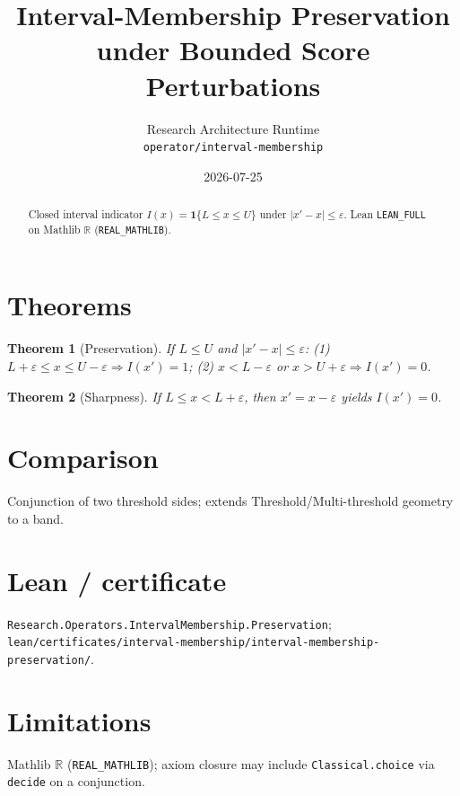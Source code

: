 \documentclass[11pt]{article}
\title{Interval-Membership Preservation under Bounded Score Perturbations}
\author{Research Architecture Runtime \\ \texttt{operator/interval-membership}}
\date{2026-07-25}
\newtheorem{theorem}{Theorem}
\begin{document}
\maketitle
\begin{abstract}
Closed interval indicator \(I(x)=\mathbf{1}\{L\le x\le U\}\) under
\(\lvert x'-x\rvert\le\varepsilon\). Lean \texttt{LEAN\_FULL} on Mathlib
\(\mathbb{R}\) (\texttt{REAL\_MATHLIB}).
\end{abstract}
\section{Theorems}
\begin{theorem}[Preservation]
If \(L\le U\) and \(\lvert x'-x\rvert\le\varepsilon\):
(1) \(L+\varepsilon\le x\le U-\varepsilon\Rightarrow I(x')=1\);
(2) \(x<L-\varepsilon\) or \(x>U+\varepsilon\Rightarrow I(x')=0\).
\end{theorem}
\begin{theorem}[Sharpness]
If \(L\le x<L+\varepsilon\), then \(x'=x-\varepsilon\) yields \(I(x')=0\).
\end{theorem}
\section{Comparison}
Conjunction of two threshold sides; extends Threshold/Multi-threshold geometry to a band.
\section{Lean / certificate}
\texttt{Research.Operators.IntervalMembership.Preservation};
\texttt{lean/certificates/interval-membership/interval-membership-preservation/}.
\section{Limitations}
Mathlib $\mathbb{R}$ (\texttt{REAL\_MATHLIB}); axiom closure may include \texttt{Classical.choice} via \texttt{decide} on a conjunction.
\end{document}
